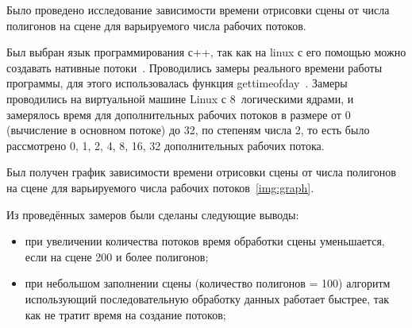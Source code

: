 
Было проведено исследование зависимости времени отрисовки сцены от числа полигонов на сцене для варьируемого числа рабочих потоков. 

Был выбран язык программирования с++, так как на linux с его помощью можно создавать нативные потоки~\cite{thread-city}. Проводились замеры реального времени работы программы, для этого использовалась функция gettimeofday~\cite{time-city}. Замеры проводились на виртуальной машине Linux с 8~логическими ядрами, и замерялось время для дополнительных рабочих потоков в размере от 0 (вычисление в основном потоке) до 32, по степеням числа 2, то есть было рассмотрено 0, 1, 2, 4, 8, 16, 32 дополнительных рабочих потока.

Был получен график зависимости времени отрисовки сцены от числа полигонов на сцене для варьируемого числа рабочих потоков~\ref{img:graph}.


Из проведённых замеров были сделаны следующие выводы:
\begin{itemize}
	\item{при увеличении количества потоков время обработки сцены уменьшается, если на сцене 200 и более полигонов;}
	\item{при небольшом заполнении сцены (количество полигонов = 100) алгоритм использующий последовательную обработку данных работает быстрее, так как не тратит время на создание потоков;}
\end{itemize}


\clearpage
